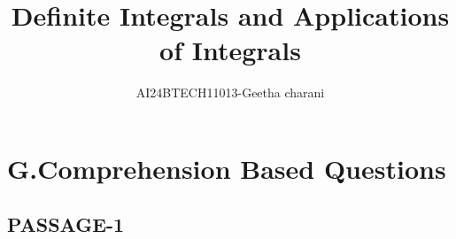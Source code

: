 \documentclass[journal,12pt,onecolumn]{IEEEtran}
\theoremstyle{remark}
\begin{document}

\vspace{3cm}

\title{Definite Integrals and Applications of Integrals}
\author{AI24BTECH11013-Geetha charani}
\maketitle
\bigskip

\renewcommand{\thefigure}{\theenumi}
\renewcommand{\thetable}{\theenumi}
\section{G.Comprehension Based Questions}
\subsection{PASSAGE-1}
\end{document}

